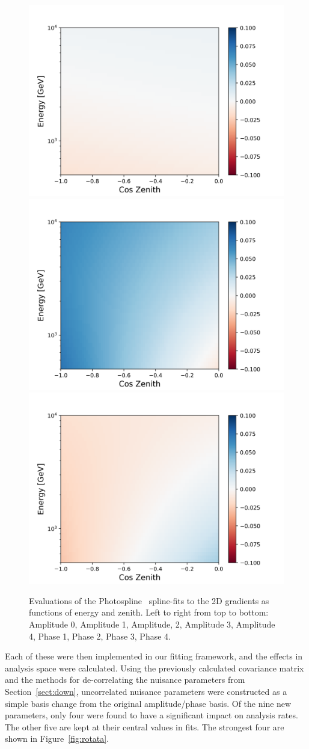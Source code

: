 \documentclass[main.tex]{subfiles}
\begin{document}
\begin{figure}
    \includegraphics[width=0.3\linewidth]{figures/spline_phase02_gradient.png}%
    \includegraphics[width=0.3\linewidth]{figures/spline_phase03_gradient.png}%
    \includegraphics[width=0.3\linewidth]{figures/spline_phase04_gradient.png}
    \caption{Evaluations of the Photospline~\cite{WHITEHORN20132214} spline-fits to the 2D gradients as functions of energy and zenith. Left to right from top to bottom: Amplitude 0, Amplitude 1, Amplitude, 2, Amplitude 3, Amplitude 4, Phase 1, Phase 2, Phase 3, Phase 4.}\label{fig:gradients}
\end{figure}

Each of these were then implemented in our fitting framework, and the effects in analysis space were calculated. 
Using the previously calculated covariance matrix and the methods for de-correlating the nuisance parameters from Section~\ref{sect:down}, uncorrelated nuisance parameters were constructed as a simple basis change from the original amplitude/phase basis. 
Of the nine new parameters, only four were found to have a significant impact on analysis rates. The other five are kept at their central values in fits. 
The strongest four are shown in Figure~\ref{fig:rotata}.
\end{document}
